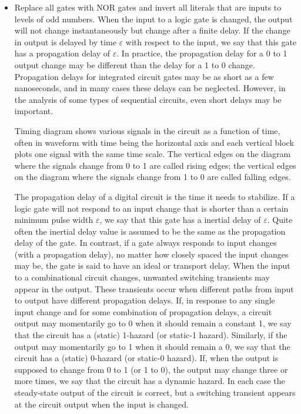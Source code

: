 \documentclass[a4paper,12pt]{article}
\begin{document}
\begin{itemize}
\begin{itemize}
\begin{itemize}
\begin{itemize}
\begin{itemize}
\begin{itemize}
\begin{itemize}
\item Replace all gates with NOR gates and invert all literals that are inputs to levels of odd numbers.
\een
{}
When the input to a logic gate is changed, the output will not change instantaneously but change after a finite delay. If the change in output is delayed by time $\varepsilon$ with respect to the input, we say that this gate has a propagation delay of $\varepsilon$. In practice, the propagation delay for a 0 to 1 output change may be different than the delay for a 1 to 0 change. Propagation delays for integrated circuit gates may be as short as a few nanoseconds, and in many cases these delays can be neglected. However, in the analysis of some types of sequential circuits, even short delays may be important.

Timing diagram shows various signals in the circuit as a function of time, often in waveform with time being the horizontal axis and each vertical block plots one signal with the same time scale. The vertical edges on the diagram where the signals change from 0 to 1 are called rising edges; the vertical edges on the diagram where the signals change from 1 to 0 are called falling edges.

The propagation delay of a digital circuit is the time it needs to stabilize.
If a logic gate will not respond to an input change that is shorter than a certain minimum pulse width $\varepsilon$, we say that this gate has a inertial delay of $\varepsilon$. Quite often the inertial delay value is assumed to be the same as the propagation delay of the gate. In contrast, if a gate always responds to input changes (with a propagation delay), no matter how closely spaced the input changes may be, the gate is said to have an ideal or transport delay.
When the input to a combinational circuit changes, unwanted switching transients may appear in the output. These transients occur when different paths from input to output have different propagation delays. If, in response to any single input change and for some combination of propagation delays, a circuit output may momentarily go to 0 when it should remain a constant 1, we say that the circuit has a (static) 1-hazard (or static-1 hazard). Similarly, if the output may momentarily go to 1 when it should remain a 0, we say that the circuit has a (static) 0-hazard (or static-0 hazard). If, when the output is supposed to change from 0 to 1 (or 1 to 0), the output may change three or more times, we say that the circuit has a dynamic hazard. In each case the steady-state output of the circuit is correct, but a switching transient appears at the circuit output when the input is changed.


\end{itemize}
\end{itemize}
\end{itemize}
\end{itemize}
\end{itemize}
\end{itemize}
\end{itemize}
\end{document}
